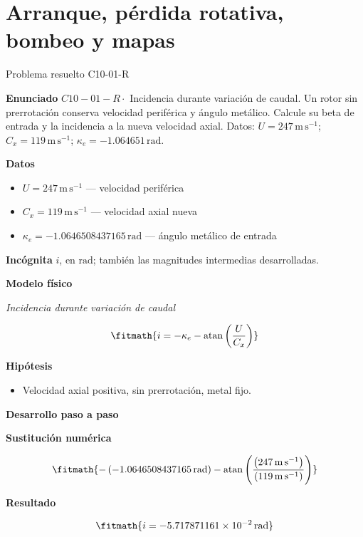 \documentclass[10pt,openany]{book}
\begin{document}
\chapter{Arranque, pérdida rotativa, bombeo y mapas}
\begin{studiumworked}{Problema resuelto C10-01-R}


\noindent\textbf{Enunciado}
\(C10-01-R \cdot\) Incidencia durante variación de caudal. Un rotor sin prerrotación conserva velocidad periférica y ángulo metálico. Calcule su beta de entrada y la incidencia a la nueva velocidad axial. Datos: \(U=247\, \mathrm{m}\,\mathrm{s}^{-1}\); \(C_x=119\, \mathrm{m}\,\mathrm{s}^{-1}\); \(\kappa_e=-1.064651\, \mathrm{rad}\).

\noindent\textbf{Datos}
\begin{itemize}
\item $U = 247\,\mathrm{m}\,\mathrm{s}^{-1}$ — velocidad periférica
\item $C_x = 119\,\mathrm{m}\,\mathrm{s}^{-1}$ — velocidad axial nueva
\item $\kappa_e = -1.0646508437165\,\mathrm{rad}$ — ángulo metálico de entrada
\end{itemize}

\noindent\textbf{Incógnita}
$i$, en $\mathrm{rad}$; también las magnitudes intermedias desarrolladas.

\noindent\textbf{Modelo físico}

\noindent\textit{Incidencia durante variación de caudal}

\[
\fitmath{i=- \kappa_e - \operatorname{atan}{\left(\frac{U}{C_x} \right)}}
\]

\noindent\textbf{Hipótesis}
\begin{itemize}
\item Velocidad axial positiva, sin prerrotación, metal fijo.
\end{itemize}

\noindent\textbf{Desarrollo paso a paso}



\noindent\textbf{Sustitución numérica}

\[
\fitmath{- \left(-1.0646508437165\,\mathrm{rad}\right) - \operatorname{atan}{\left(\frac{\left(247\,\mathrm{m}\,\mathrm{s}^{-1}\right)}{\left(119\,\mathrm{m}\,\mathrm{s}^{-1}\right)} \right)}}
\]

\noindent\textbf{Resultado}

\[
\fitmath{i=-5.717871161\times10^{-2}\,\mathrm{rad}}
\]


\end{studiumworked}
\end{document}
